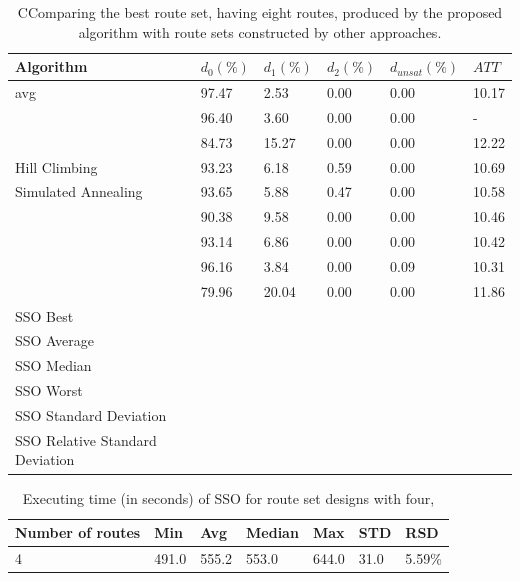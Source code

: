     \begin{table}[H]
    \centering
    \hspace*{-1.0cm}
    \begin{tabular}{|l||l|l|l|l|l|}
    \hline
    Algorithm & $d_0(\%)$ & $d_1(\%)$ & $d_2(\%)$ & $d_{unsat}(\%)$ & $ATT$ \\
    \hline
    \citet{kechagiopoulos14} avg & 97.47 & 2.53 & 0.00 & 0.00 & 10.17 \\
    \citet{nikolic14} & 96.40 & 3.60 & 0.00 & 0.00 & - \\
    \citet{kidwai98} & 84.73 & 15.27 & 0.00 & 0.00 & 12.22 \\
    \citet{fan09} Hill Climbing & 93.23 & 6.18 & 0.59 & 0.00 & 10.69 \\
    \citet{fan09} Simulated Annealing & 93.65 & 5.88 & 0.47 & 0.00 & 10.58 \\
    \citet{chakroborty02} & 90.38 & 9.58 & 0.00 & 0.00 & 10.46 \\
    \citet{zhang10} & 93.14 & 6.86 & 0.00 & 0.00 & 10.42 \\
    \citet{chew12} & 96.16 & 3.84 & 0.00 & 0.09 & 10.31 \\
    \citet{baaj91} & 79.96 & 20.04 & 0.00 & 0.00 & 11.86 \\
    \hline
    \hline
    SSO Best & ~ & ~ & ~ & ~ & ~ \\
    SSO Average & ~ & ~ & ~ & ~ & ~ \\
    SSO Median & ~ & ~ & ~ & ~ & ~ \\
    SSO Worst & ~ & ~ & ~ & ~ & ~ \\
    SSO Standard Deviation & ~ & ~ & ~ & ~ & ~ \\
    SSO Relative Standard Deviation & ~ & ~ & ~ & ~ & ~ \\
    \hline
    \end{tabular}
    \caption {CComparing the best route set, having eight routes, produced by the proposed algorithm with route sets constructed by other approaches.}
    \label{table:performanceComparison_8}
    \end{table}

\begin{table}[H]
    \centering
    \begin{tabular}{|l||l|l|l|l|l|l|}
    \hline
    Number of routes & Min & Avg & Median & Max & STD & RSD \\
    \hline
    4 & 491.0 & 555.2 & 553.0 & 644.0 & 31.0 & 5.59\%\\
    \hline
    \end{tabular}
    \caption {Executing time (in seconds) of SSO for route set designs with four, }
    \label{table:performanceComparison_runtime}
    \end{table}




